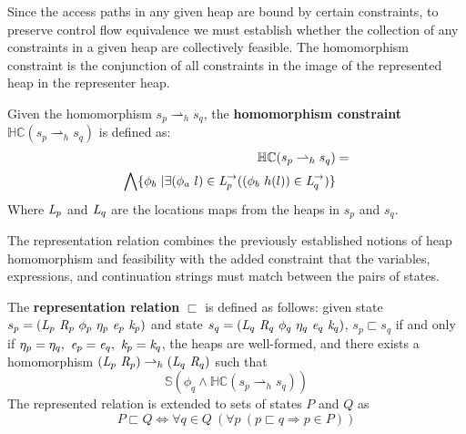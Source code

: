 Since the access paths in any given heap are bound by certain constraints, to preserve control flow equivalence we must establish whether the collection of any constraints in a given heap are collectively feasible. The homomorphism constraint is the conjunction of all constraints in the image of the represented heap in the representer heap.

\begin{definition}
\label{def:hc}
Given the homomorphism $s_p \rightharpoonup_{h} s_q$, the \textbf{homomorphism constraint} $\mathbb{HC}(s_p \rightharpoonup_{h} s_q)$ is defined as:
\begin{align*}
\mathbb{HC}(s_p \rightharpoonup_{h} s_q) &= \\
 \bigwedge \{ \phi_b\ | \exists (\phi_a\ l) \in \emph{L}_p^\rightarrow ( (\phi_b\ h(l)) \in \emph{L}_q^\rightarrow)\} 
\end{align*}
Where $\emph{L}_p$ and $\emph{L}_q$ are the locations maps from the heaps in $s_p$ and $s_q$.
\end{definition}

The representation relation combines the previously established
notions of heap homomorphism and feasibility with the added constraint
that the variables, expressions, and continuation strings must match
between the pairs of states.

\begin{definition}
\label{representation}
The \textbf{representation relation} $\sqsubset$ is defined as
follows: given state $s_p = (
\emph{L}_p\ \emph{R}_p\ \phi_p\ \eta_p\ \emph{e}_p\ \emph{k}_p )$
and state $s_q = (
\emph{L}_q\ \emph{R}_q\ \phi_q\ \eta_q\ \emph{e}_q\ \emph{k}_q )$,
$s_p \sqsubset s_q $ if and only if $\eta_p = \eta_q ,\ \emph{e}_p =
\emph{e}_q ,\ \emph{k}_p = \emph{k}_q$, the heaps are well-formed, and there exists a
homomorphism $(\emph{L}_p\ \emph{R}_p) \rightharpoonup_{h}
(\emph{L}_q\ \emph{R}_q)$ such that
\begin{equation}
\label{eqn:valid}
 \mathbb{S}( \phi_q \wedge \mathbb{HC}(s_p \rightharpoonup_{h} s_q) ) 
\end{equation}
The represented relation is extended to sets of states $P$ and $Q$ as
$$
P \sqsubset Q \Longleftrightarrow \forall q \in Q\ (\forall p\ (p \sqsubset q \Rightarrow p \in P))
$$
\end{definition}

